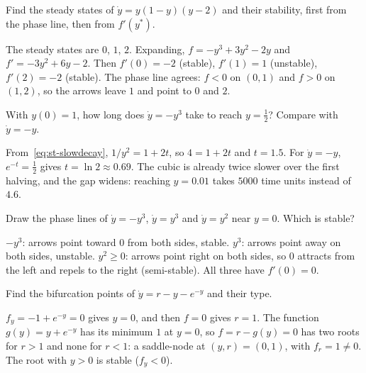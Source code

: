 \label{sec:st-exo}


\label{exo:st-three}
%
Find the steady states of $\dot y = y(1-y)(y-2)$ and their stability, first from
the phase line, then from $f'(y^*)$.
\begin{solution}
The steady states are $0$, $1$, $2$. Expanding, $f = -y^3 + 3y^2 - 2y$ and
$f' = -3y^2 + 6y - 2$. Then $f'(0) = -2$ (stable), $f'(1) = 1$ (unstable),
$f'(2) = -2$ (stable). The phase line agrees: $f < 0$ on $(0,1)$ and $f > 0$ on
$(1,2)$, so the arrows leave $1$ and point to $0$ and $2$.
\end{solution}

\label{exo:st-slow}
%
With $y(0) = 1$, how long does $\dot y = -y^3$ take to reach $y = \tfrac12$?
Compare with $\dot y = -y$.
\begin{solution}
From~\eqref{eq:st-slowdecay}, $1/y^2 = 1 + 2t$, so $4 = 1 + 2t$ and $t = 1.5$. For
$\dot y = -y$, $e^{-t} = \tfrac12$ gives $t = \ln 2 \approx 0.69$. The cubic is
already twice slower over the first halving, and the gap widens: reaching
$y = 0.01$ takes $5000$ time units instead of $4.6$.
\end{solution}

\label{exo:st-silent}
Draw the phase lines of $\dot y = -y^3$, $\dot y = y^3$ and $\dot y = y^2$ near
$y = 0$. Which is stable?
\begin{solution}
$-y^3$: arrows point toward $0$ from both sides, stable. $y^3$: arrows point away
on both sides, unstable. $y^2 \ge 0$: arrows point right on both sides, so $0$
attracts from the left and repels to the right (semi-stable). All three have
$f'(0) = 0$.
\end{solution}

\label{exo:st-disguise}
%
Find the bifurcation points of $\dot y = r - y - e^{-y}$ and their type.
\begin{solution}
$f_y = -1 + e^{-y} = 0$ gives $y = 0$, and then $f = 0$ gives $r = 1$. The function
$g(y) = y + e^{-y}$ has its minimum $1$ at $y = 0$, so $f = r - g(y) = 0$ has two
roots for $r > 1$ and none for $r < 1$: a saddle-node at $(y,r) = (0,1)$, with
$f_r = 1 \neq 0$. The root with $y > 0$ is stable ($f_y < 0$).
\end{solution}

